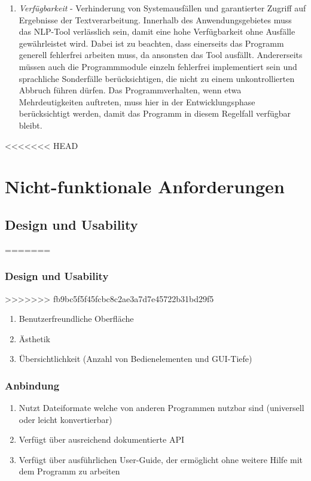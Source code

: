 \documentclass[12pt]{report}
\begin{document}
\begin{enumerate}
\begin{enumerate}
\item \textit{Verfügbarkeit} - Verhinderung von Systemausfällen und garantierter Zugriff auf Ergebnisse der Textverarbeitung. Innerhalb des Anwendungsgebietes muss das NLP-Tool verlässlich sein, damit eine hohe Verfügbarkeit ohne Ausfälle gewährleistet wird. Dabei ist zu beachten, dass einerseits das Programm generell fehlerfrei arbeiten muss, da ansonsten das Tool ausfällt. Andererseits müssen auch die Programmmodule einzeln fehlerfrei implementiert sein und sprachliche Sonderfälle berücksichtigen, die nicht zu einem unkontrollierten Abbruch führen dürfen. Das Programmverhalten, wenn etwa Mehrdeutigkeiten auftreten, muss hier in der Entwicklungsphase berücksichtigt werden, damit das Programm in diesem Regelfall verfügbar bleibt.
\end{enumerate} 

\end{enumerate}
<<<<<<< HEAD
\section{Nicht-funktionale Anforderungen}
\subsection{Design und Usability}
=======


\subsubsection{Design und Usability}
>>>>>>> fb9bc5f5f45fcbc8c2ae3a7d7e45722b31bd29f5
\begin{enumerate}
\item Benutzerfreundliche Oberfläche
\item Ästhetik 
\item Übersichtlichkeit (Anzahl von Bedienelementen und GUI-Tiefe)  
\end{enumerate}
\subsubsection{Anbindung}
\begin{enumerate}
\item Nutzt Dateiformate welche von anderen Programmen nutzbar sind (universell oder leicht konvertierbar) 
\item Verfügt über ausreichend dokumentierte API
\item Verfügt über ausführlichen User-Guide, der ermöglicht ohne weitere Hilfe mit dem Programm zu arbeiten
\end{enumerate}
\end{document}
